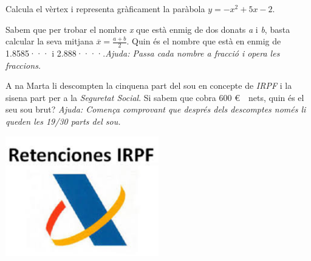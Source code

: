 \begin{mylist}
	 \exer[2] Calcula el vèrtex i representa gràficament la paràbola $y=-x^2+5x-2$.
	 
 	
		\exer[2]  Sabem que per trobar el nombre \textit{x} que està enmig de dos donats \textit{a} i \textit{b}, basta calcular la seva mitjana $\overline{x}=\frac{a+b}{2}$. Quin és el nombre que està en enmig de 1.8585··· i 2.888····.\textit{Ajuda: Passa cada nombre a fracció i opera les fraccions.}
	
	\vspace*{-1.5cm}
	\exer[2] \begin{minipage}[t]{0.7\textwidth}
		A na Marta li descompten la cinquena part del sou en concepte de \textit{IRPF} i la sisena part per a la \textit{Seguretat Social}. Si sabem que cobra 600 \euro\ \ nets, quin és el seu sou brut? \textit{Ajuda: Comença comprovant que després dels descomptes només li queden les 19/30 parts del sou.}
	\end{minipage}
	\begin{minipage}{0.3\textwidth}
		\centering
		\vspace{1.5cm}
		\includegraphics[width=0.5\textwidth]{img-12/image1}
	\end{minipage}
	

\end{mylist}
